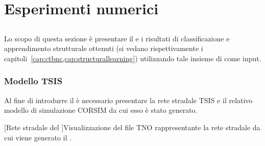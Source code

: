 
\chapter{Esperimenti numerici}\label{cap:esperimenti}
\omissis{}

\section{}\label{sec:dataset-1}
Lo scopo di questa sezione è presentare il  e i risultati di classificazione e apprendimento strutturale ottenuti (si vedano rispettivamente i capitoli~\vref{cap:ctbnc,cap:structurallearning}) utilizzando tale insieme di \emph{} come input.

\subsection{Modello TSIS}\label{subsec:tsis-simple-model}
Al fine di introdurre il  è necessario presentare la rete stradale \acs{TSIS} e il relativo modello di simulazione \acs{CORSIM} da cui esso è stato generato.

\omissis{}


\cleardoublepage
\begin{center}
\capfigure
\captionsetup{type=figure}
\captionsetup[subfigure]{labelformat=empty}
\cleardoublepage
{}
[Rete stradale del ]{Visualizzazione del file \acs{TNO} rappresentante la rete stradale da cui viene generato il .}
\label{fig:tsis-model-simple}
\end{center}

